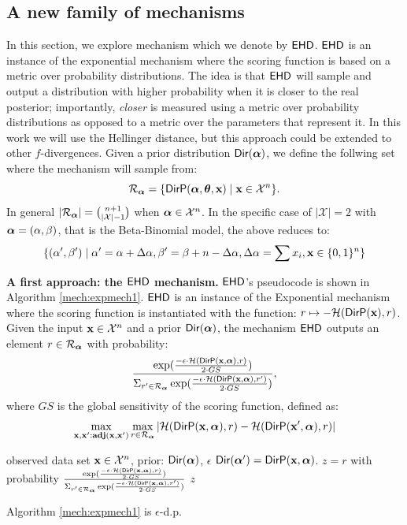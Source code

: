 \documentclass{article}
\begin{document}
\subsection{A new family of mechanisms}
\label{sec_exp}
In this section, we explore  mechanism which we denote by $\expmech$. $\expmech$ is an instance
of the exponential mechanism \cite{talwar} where the scoring function is based on a metric over
probability distributions.
The idea is that $\expmech$ will sample and output a distribution with higher probability when
it is closer to the real posterior; importantly,  \emph{closer} is measured using a metric over probability
distributions as opposed to a metric over the parameters that represent it. In this work we will
use the Hellinger distance, but this approach could be extended to other $f$-divergences. 
Given a prior distribution $\mathsf{Dir}(\boldsymbol{\alpha})$,
we define the follwing set  where the mechanism will sample from:
\[
  \mathcal{R}_{\boldsymbol{\alpha}}=\{\mathsf{DirP}(\boldsymbol{\alpha},\boldsymbol{\theta},\textbf{x})\mid \textbf{x} \in \mathcal{X}^n\}.
\]
In general $|\mathcal{R}_{\boldsymbol{\alpha}}|=\binom{n + 1}{|\mathcal{X}| - 1}$ when $\boldsymbol{\alpha}\in\mathcal{X}^n$. In the specific case of $|\mathcal{X}|=2$ with $\boldsymbol{\alpha}=(\alpha,\beta)$,
that is the Beta-Binomial model, the above reduces to:
\[
  \{(\alpha',\beta')\mid \alpha'=\alpha + \Delta\alpha, \beta'=\beta + n-\Delta\alpha,  \Delta\alpha=\sum x_i, \textbf{x}\in \{0,1\}^n\}
\]

\noindent \textbf{A first approach: the $\expmech$ mechanism.}
\label{sec_ehd}
$\expmech$'s pseudocode is shown in Algorithm \ref{mech:expmech1}. $\expmech$ is an instance
of the Exponential mechanism where the scoring function is instantiated with the function: $r\mapsto -\mathcal{H}(\mathsf{DirP}(\textbf{x}), r)$.
Given the input $\textbf{x}\in\mathcal{X}^n$ and a prior $\mathsf{Dir}(\boldsymbol{\alpha})$, the mechanism $\expmech$ outputs an element $r\in\mathcal{R}_{\boldsymbol{\alpha}}$ with  probability: 
\[
\frac
  {\exp(\frac{-\epsilon\cdot \mathcal{H}(\mathsf{DirP}(\textbf{x},\boldsymbol{\alpha}), r)}{2\cdot GS})}
{\Sigma_{r' \in \mathcal{R}_{\boldsymbol{\alpha}}}\exp(\frac{-\epsilon\cdot \mathcal{H}(\mathsf{DirP}(\textbf{x},\boldsymbol{\alpha}), r')}{2\cdot GS})},
\]
where $GS$ is the global sensitivity of the scoring function, defined as:
\[
\max_{\textbf{x},\textbf{x}': \\ \textbf{adj}(\textbf{x},\textbf{x}')}\max_{r\in \mathcal{R}_{\boldsymbol{\alpha}}}
|\mathcal{H}(\mathsf{DirP}(\textbf{x},\boldsymbol{\alpha}), r) - \mathcal{H}(\mathsf{DirP}(\textbf{x}',\boldsymbol{\alpha}), r)|
\]
% 
  \begin{algorithm}
  \caption{$\expmech$}
  \label{mech:expmech1}
  \begin{algorithmic}
  \INPUT observed data set $\textbf{x} \in \mathcal{X}^n$, prior: $\mathsf{Dir}(\boldsymbol{\alpha})$, $\epsilon$
  \STATE {} $\mathsf{Dir}(\boldsymbol{\alpha}')= \mathsf{DirP}(\textbf{x},\boldsymbol{\alpha})$.   
  \STATE {} $z=r$ with probability $\frac
  {\exp(\frac{-\epsilon\cdot \mathcal{H}(\mathsf{DirP}(\textbf{x},\boldsymbol{\alpha}), r)}{2\cdot GS})}
{\Sigma_{r' \in \mathcal{R}_{\boldsymbol{\alpha}}}\exp(\frac{-\epsilon\cdot \mathcal{H}(\mathsf{DirP}(\textbf{x},\boldsymbol{\alpha}), r')}{2\cdot GS})}$
 $z$
  \end{algorithmic}
  \end{algorithm}
\begin{lem}
  Algorithm \ref{mech:expmech1} is $\epsilon$-d.p.
\end{lem}
\end{document}
